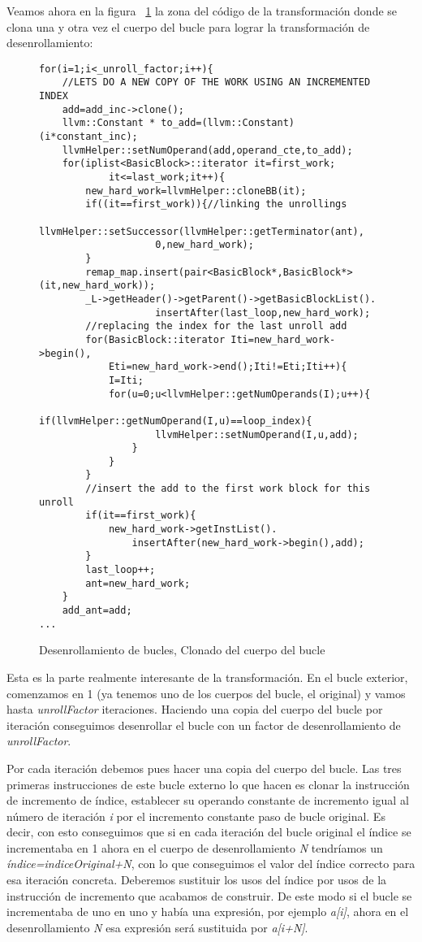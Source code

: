 Veamos ahora en la figura ~\ref{FIG:LoopUnrollClone} la zona del código de la transformación donde se clona una y otra vez el cuerpo del bucle para lograr la transformación de desenrollamiento:

\begin{figure}[tph]
\begin{lstlisting}
for(i=1;i<_unroll_factor;i++){
	//LETS DO A NEW COPY OF THE WORK USING AN INCREMENTED INDEX
	add=add_inc->clone();
	llvm::Constant * to_add=(llvm::Constant)(i*constant_inc);
	llvmHelper::setNumOperand(add,operand_cte,to_add);
	for(iplist<BasicBlock>::iterator it=first_work;
			it<=last_work;it++){
		new_hard_work=llvmHelper::cloneBB(it);
		if((it==first_work)){//linking the unrollings
			llvmHelper::setSuccessor(llvmHelper::getTerminator(ant),
					0,new_hard_work);
		}
		remap_map.insert(pair<BasicBlock*,BasicBlock*>(it,new_hard_work));
		_L->getHeader()->getParent()->getBasicBlockList().
					insertAfter(last_loop,new_hard_work);
		//replacing the index for the last unroll add
		for(BasicBlock::iterator Iti=new_hard_work->begin(),
			Eti=new_hard_work->end();Iti!=Eti;Iti++){
			I=Iti;
			for(u=0;u<llvmHelper::getNumOperands(I);u++){
				if(llvmHelper::getNumOperand(I,u)==loop_index){
					llvmHelper::setNumOperand(I,u,add);
				}
			}
		}
		//insert the add to the first work block for this unroll
		if(it==first_work){
			new_hard_work->getInstList().
				insertAfter(new_hard_work->begin(),add);
		}
		last_loop++;
		ant=new_hard_work;
	}
	add_ant=add;
...
\end{lstlisting}
\caption{Desenrollamiento de bucles, Clonado del cuerpo del bucle}
\label{FIG:LoopUnrollClone}
\end{figure}

Esta es la parte realmente interesante de la transformación. En el bucle exterior, comenzamos en 1 (ya tenemos uno de los cuerpos del bucle, el original) y vamos hasta \textit{unrollFactor} iteraciones. Haciendo una copia del cuerpo del bucle por iteración conseguimos desenrollar el bucle con un factor de desenrollamiento de \textit{unrollFactor}.

Por cada iteración debemos pues hacer una copia del cuerpo del bucle. Las tres primeras instrucciones de este bucle externo lo que hacen es clonar la instrucción de incremento de índice, establecer su operando constante de incremento igual al número de iteración \textit{i} por el incremento constante paso de bucle original. Es decir, con esto conseguimos que si en cada iteración del bucle original el índice se incrementaba en 1 ahora en el cuerpo de desenrollamiento \textit{N} tendríamos un \textit{índice=indiceOriginal+N}, con lo que conseguimos el valor del índice correcto para esa iteración concreta. Deberemos sustituir los usos del índice por usos de la instrucción de incremento que acabamos de construir. De este modo si el bucle se incrementaba de uno en uno y había una expresión, por ejemplo \textit{a[i]}, ahora en el desenrollamiento \textit{N} esa expresión será sustituida por \textit{a[i+N]}.

